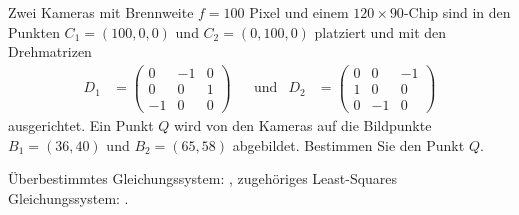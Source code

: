 Zwei Kameras mit Brennweite $f=100$ Pixel und einem $120\times 90$-Chip
sind in den Punkten $C_1=(100,0,0)$ und $C_2=(0,100,0)$ platziert
und mit den Drehmatrizen
\[
\begin{aligned}
D_1
&=
\begin{pmatrix}
   0& -1&  0\\
   0&  0&  1\\
  -1&  0&  0
\end{pmatrix}
&
&\text{und}
&
D_2
&=
\begin{pmatrix}
   0&  0& -1\\
   1&  0&  0\\
   0& -1&  0
\end{pmatrix}
\end{aligned}
\]
ausgerichtet.
Ein Punkt $Q$ wird von den Kameras auf die Bildpunkte
$B_1=(36,40)$ und $B_2=(65,58)$ abgebildet.
Bestimmen Sie den Punkt $Q$.

\begin{hinweis}
Überbestimmtes Gleichungssystem: ,
zugehöriges Least-Squares Gleichungssystem: .
\end{hinweis}


